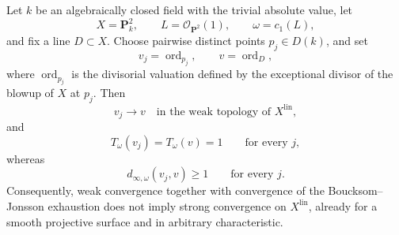 \begin{theorem}
Let \(k\) be an algebraically closed field with the trivial absolute value,
let
\[
             X=\mathbf P^2_k,
             \qquad L=\mathcal O_{\mathbf P^2}(1),
             \qquad \omega=c_1(L),
\]
and fix a line \(D\subset X\).  Choose pairwise distinct points
\(p_j\in D(k)\), and set
\[
             v_j=\operatorname{ord}_{p_j},
             \qquad v=\operatorname{ord}_D,
\]
where \(\operatorname{ord}_{p_j}\) is the divisorial valuation defined by
the exceptional divisor of the blowup of \(X\) at \(p_j\).  Then
\[
              v_j\longrightarrow v
              \quad\text{in the weak topology of }X^{\mathrm{lin}},
\]
and
\[
              T_\omega(v_j)=T_\omega(v)=1
              \qquad\text{for every }j,
\]
whereas
\[
              d_{\infty,\omega}(v_j,v)\geq1
              \qquad\text{for every }j.
\]
Consequently, weak convergence together with convergence of the
Boucksom--Jonsson exhaustion does not imply strong convergence on
\(X^{\mathrm{lin}}\), already for a smooth projective surface and in
arbitrary characteristic.
\end{theorem}
